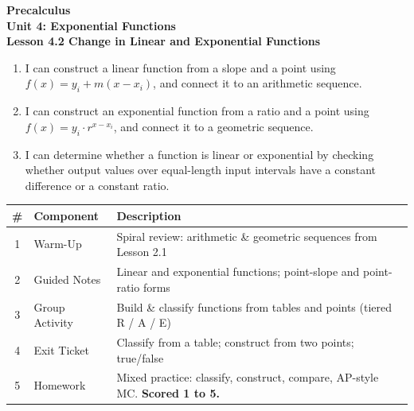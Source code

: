 \documentclass[10pt]{article}
\begin{document}
\vspace{-0.8in}

\begin{center}
  {\color{white}\textbf{\LARGE Precalculus}}\\[4pt]
  {\color{skymid}\large\textbf{Unit 4: Exponential Functions}}\\[6pt]
  {\color{white}\textbf{\large Lesson 4.2 \quad Change in Linear and Exponential Functions}}
\end{center}

\vspace{0.22in}
\namedateperiod
\vspace{0.18in}

\begin{learningtargetbox}
\small
\begin{enumerate}[leftmargin=1.5em, itemsep=5pt]
  \item I can construct a linear function from a slope and a point using
        $f(x) = y_i + m(x - x_i)$, and connect it to an arithmetic sequence.
  \item I can construct an exponential function from a ratio and a point using
        $f(x) = y_i \cdot r^{x - x_i}$, and connect it to a geometric sequence.
  \item I can determine whether a function is linear or exponential by checking whether
        output values over equal-length input intervals have a constant difference or a
        constant ratio.
\end{enumerate}
\end{learningtargetbox}

\vspace{0.14in}

\begin{tocbox}
\small
\renewcommand{\arraystretch}{1.5}
\begin{tabularx}{\linewidth}{@{} c l X @{}}
\rowcolor{sky}
\textbf{\#} & \textbf{Component} & \textbf{Description} \\
\midrule
1 & Warm-Up        & Spiral review: arithmetic \& geometric sequences from Lesson 2.1 \\
2 & Guided Notes   & Linear and exponential functions; point-slope and point-ratio forms \\
3 & Group Activity & Build \& classify functions from tables and points (tiered R / A / E) \\
4 & Exit Ticket    & Classify from a table; construct from two points; true/false \\
5 & Homework       & Mixed practice: classify, construct, compare, AP-style MC. \textbf{Scored 1 to 5.} \\
\end{tabularx}
\end{tocbox}
\end{document}
